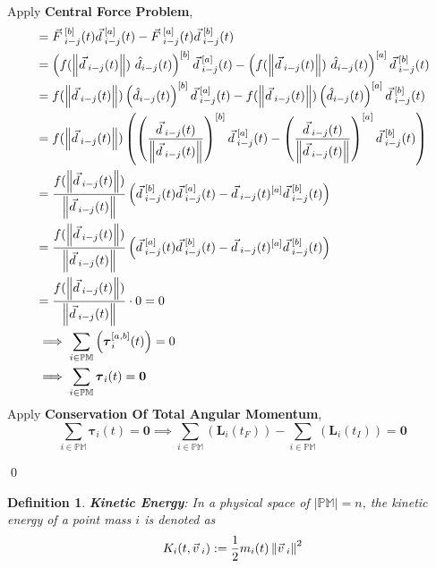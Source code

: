 \documentclass[12pt]{amsart}
\newtheorem{definition}[theorem]{Definition}
\renewenvironment{proof}{{\bfseries Proof.}}{\qed}
\let\oldvec\vec
\renewcommand{\vec}[1]{\oldvec{#1}\hspace{0.1em}}
\begin{document}
\begin{proof}
\begin{align*}
    \end{align*}
    Apply \textbf{Central Force Problem},
    \begin{align*}
    &= \vec{F}^{[b]}_{i-j} (t)  \vec{d}^{[a]}_{i-j} (t) -  \vec{F}^{[a]}_{i-j} (t) \vec{d}^{[b]}_{i-j} (t)\\
    & = \left ( f(\left \|\vec{d}_{i-j} (t)\right \|)\ \hat{d}_{i-j} (t) \right ) ^{[b]} \vec{d}^{[a]}_{i-j} (t) -  \left ( f(\left \|\vec{d}_{i-j} (t)\right \|)\ \hat{d}_{i-j} (t) \right ) ^{[a]} \vec{d}^{[b]}_{i-j} (t)\\
    & =  f(\left \|\vec{d}_{i-j} (t)\right \|) \left ( \hat{d}_{i-j} (t) \right ) ^{[b]} \vec{d}^{[a]}_{i-j} (t) -  f(\left \|\vec{d}_{i-j} (t)\right \|) \left ( \hat{d}_{i-j} (t) \right ) ^{[a]} \vec{d}^{[b]}_{i-j} (t)\\
    & =  f(\left \|\vec{d}_{i-j} (t)\right \|) \left ( \left ( \dfrac{\vec{d}_{i-j} (t)}{\left \| \vec{d}_{i-j} (t) \right \|} \right ) ^{[b]} \vec{d}^{[a]}_{i-j} (t) -   \left ( \dfrac{\vec{d}_{i-j} (t)}{\left \| \vec{d}_{i-j} (t) \right \|} \right ) ^{[a]} \vec{d}^{[b]}_{i-j} (t) \right ) \\
    &=  \dfrac{f(\left \|\vec{d}_{i-j} (t)\right \|)}{\left \| \vec{d}_{i-j} (t) \right \|} \left ( \vec{d}_{i-j} ^{[b]} (t) \vec{d}^{[a]}_{i-j} (t) -   \vec{d}_{i-j} (t)  ^{[a]} \vec{d}^{[b]}_{i-j} (t) \right ) \\
    & =  \dfrac{f(\left \|\vec{d}_{i-j} (t)\right \|)}{\left \| \vec{d}_{i-j} (t) \right \|} \left ( \vec{d}^{[a]}_{i-j} (t) \vec{d}_{i-j} ^{[b]} (t) -   \vec{d}_{i-j} (t)  ^{[a]} \vec{d}^{[b]}_{i-j} (t) \right )\\
    &=  \dfrac{f(\left \|\vec{d}_{i-j} (t)\right \|)}{\left \| \vec{d}_{i-j} (t) \right \|} \cdot 0 = 0\\
    &\implies \displaystyle \sum_{i \in \mathbb{PM}} \left ( \boldsymbol{\tau}_{i} ^{[a,b]} (t) \right ) = 0 \\
    &\implies \displaystyle \sum_{i \in \mathbb{PM}} \boldsymbol{\tau}_{i} (t) = \boldsymbol{0}
    \end{align*}
    Apply \textbf{Conservation Of Total Angular Momentum},
    $$
    \displaystyle \sum_{i \in \mathbb{PM}} \boldsymbol{\tau}_{i} (t) = \boldsymbol{0} \implies \sum_{i \in \mathbb{PM}} \left( \boldsymbol{L}_{i}(t_F) \right)- \sum_{i \in \mathbb{PM}} \left( \boldsymbol{L}_{i}(t_I) \right) = \boldsymbol{0}
    $$
    
\end{proof}

\begin{definition}
    \textbf{Kinetic Energy}: In a physical space of $\left | \mathbb{PM} \right | = n$, the kinetic energy of a point mass $i$ is denoted as $$ K_i (t, \vec{v}_i) := \dfrac{1}{2} m_i (t) \left \| \vec{v}_i \right \|^2 $$
\end{definition}
\end{document}
